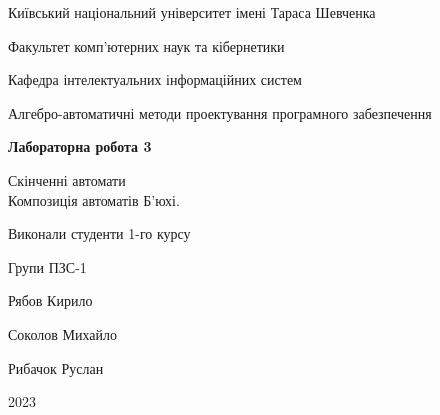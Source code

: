 \documentclass[12pt,a4paper]{article}
\begin{document}
\begin{titlepage}
    \centering
    \vspace*{1cm}

    \Large
    Київський національний університет імені Тараса Шевченка \\

    \vspace{0.5cm}

    \large
    Факультет комп'ютерних наук та кібернетики \\

    \vspace{0.5cm}

    Кафедра інтелектуальних інформаційних систем \\

    \vspace{0.5cm}

    Алгебро-автоматичні методи проектування програмного забезпечення \\

    \vspace{3cm}

    \textbf{Лабораторна робота 3} \\

    \vspace{0.5cm}

    Скінченні автомати \\
    Композиція автоматів Б'юхі. \\

    \vspace{2cm}

    Виконали студенти 1-го курсу \\

    \vspace{0.2cm}

    Групи ПЗС-1 \\

    \vspace{0.1cm}

    Рябов Кирило \\

    \vspace{0.1cm}

    Соколов Михайло \\

    \vspace{0.1cm}

    Рибачок Руслан \\

    \vfill

    2023

\end{titlepage}
\end{document}
